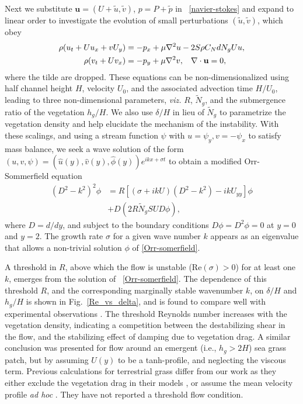 \documentclass[aps,preprint,12pt]{revtex4-1}  %
\newcommand{\bu}{\mathbf{u}}
\newcommand{\hg}{h_g}
\newcommand{\Rey}{{R}}
\newcommand{\Ndg}{\tilde{N}_g}
\begin{document}
Next we substitute $\bu = (U+\tilde{u}, \tilde{v})$, $p=P+\tilde{p}$ in ~\eqref{navier-stokes} and expand to linear order to investigate the evolution of small perturbations $(\tilde{u}, \tilde{v})$, which obey
\begin{equation}
\begin{split}
\rho(u_t+U u_x+vU_y) &= -p_x+ {\mu}\nabla^2u-2S\rho C_{N}dN_{g}Uu, \\
\rho(v_t+ Uv_x) &= -p_y+ {\mu}\nabla^2v, \hspace{0.3cm} \nabla\cdot\bu=0,
\end{split} \nonumber
\end{equation}
where the tilde are dropped.
These equations can be non-dimensionalized using half channel height $H$, velocity $U_0$, and the associated advection time $H/U_0$, leading to three non-dimensional parameters, \textit{viz.} $\Rey$, $\Ndg$, and the submergence ratio of the vegetation $h_g/H$. 
We also use $\delta/H$ in lieu of $\Ndg$ to parametrize the vegetation density and help elucidate the mechanism of the instability. 
With these scalings, and using a stream function $\psi$ with $u = \psi_{y}, v= -\psi_x$ to satisfy mass balance, we seek a wave solution of 
the form $\left(u,v,\psi \right)= \left(\hat u(y), \hat v(y), \hat\phi(y) \right)e^{ikx+\sigma t}$ to  obtain a modified Orr-Sommerfield equation \cite{Drazin81} 
\begin{equation}
\begin{split}
\left(D^2 -k^{2} \right)^2\phi &= \Rey \left[ \left({\sigma}+ikU\right) \left(D^2-k^2\right) -ikU_{yy}\right]\phi \\
&+D\left(2R \Ndg S U D \phi\right),
\label{Orr-somerfield}
\end{split}
\end{equation}
where $D=d/dy$, and subject to the boundary conditions $D\phi = D^2\phi = 0$ at $y=0$ and $y=2$. 
The growth rate $\sigma$ for a given wave number $k$ appears as an eigenvalue that allows a non-trivial solution $\phi$ of  \eqref{Orr-somerfield}.

A threshold in $\Rey$, above which the flow is unstable (Re$(\sigma)>0$) for at least one $k$, emerges from the 
solution of ~\eqref{Orr-somerfield}. The dependence of this threshold $\Rey$, and the corresponding marginally stable wavenumber $k$, on $\delta/H$ and $\hg/H$ is shown in Fig.~\ref{Re_vs_delta}, and is found to compare well with experimental observations \cite{Ghisal02}.
The threshold Reynolds number increases with the vegetation density, indicating a competition between the destabilizing shear in the flow, and the stabilizing effect of damping due to vegetation drag.
A similar conclusion was presented \cite{White07} for flow around an emergent (i.e., $\hg>2H$) sea grass patch, but by assuming $U(y)$ to be a tanh-profile, and neglecting the viscous term.
Previous calculations for terrestrial grass differ from our work as they either exclude the vegetation drag in their models \cite{Raupach96}, or assume the mean velocity profile {\it ad hoc} \cite{Raupach96,Delangre06}.
They have not reported a threshold flow condition.
\end{document}
